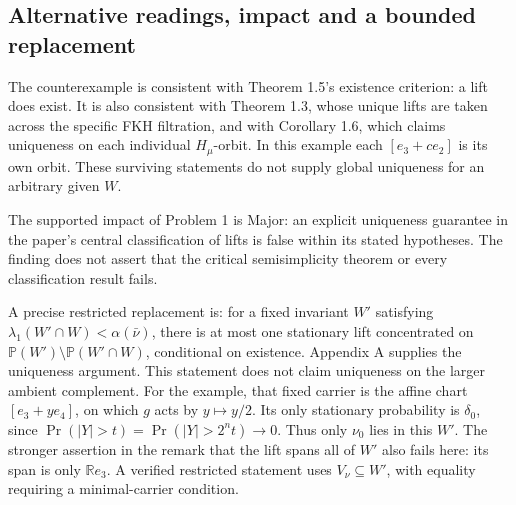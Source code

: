 \documentclass[10pt]{article}
\begin{document}
\subsection*{Alternative readings, impact and a bounded replacement}
The counterexample is consistent with Theorem 1.5’s existence criterion: a lift does exist. It is also consistent with Theorem 1.3, whose unique lifts are taken across the specific FKH filtration, and with Corollary 1.6, which claims uniqueness on each individual \(H_\mu\)-orbit. In this example each \([e_3+ce_2]\) is its own orbit. These surviving statements do not supply global uniqueness for an arbitrary given \(W\).\par
The supported impact of Problem 1 is Major: an explicit uniqueness guarantee in the paper’s central classification of lifts is false within its stated hypotheses. The finding does not assert that the critical semisimplicity theorem or every classification result fails.\par
A precise restricted replacement is: for a fixed invariant \(W'\) satisfying \(\lambda_1(W'\cap W)<\alpha(\bar\nu)\), there is at most one stationary lift concentrated on \(\mathbb P(W')\setminus\mathbb P(W'\cap W)\), conditional on existence. Appendix A supplies the uniqueness argument. This statement does not claim uniqueness on the larger ambient complement. For the example, that fixed carrier is the affine chart \([e_3+ye_4]\), on which \(g\) acts by \(y\mapsto y/2\). Its only stationary probability is \(\delta_0\), since \(\Pr(|Y|>t)=\Pr(|Y|>2^nt)\to0\). Thus only \(\nu_0\) lies in this \(W'\). The stronger assertion in the remark that the lift spans all of \(W'\) also fails here: its span is only \(\mathbb Re_3\). A verified restricted statement uses \(V_\nu\subseteq W'\), with equality requiring a minimal-carrier condition.\par
\end{document}
